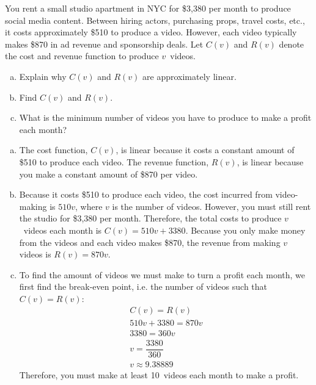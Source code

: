 \documentclass[11pt,letterpaper]{article}
\begin{document}
\newpage




 You rent a small studio apartment in NYC for \$3,380 per month to produce social media content. Between hiring actors, purchasing props, travel costs, etc., it costs approximately \$510 to produce a video. However, each video typically makes \$870 in ad revenue and sponsorship deals. Let $C(v)$ and $R(v)$ denote the cost and revenue function to produce $v$~videos. 
	\begin{enumerate}[(a)]
	\item Explain why $C(v)$ and $R(v)$ are approximately linear. 
	\item Find $C(v)$ and $R(v)$. 
	\item What is the minimum number of videos you have to produce to make a profit each month? 
	\end{enumerate} \pspace

\sol 
\begin{enumerate}[(a)]
\item The cost function, $C(v)$, is linear because it costs a constant amount of \$510 to produce each video. The revenue function, $R(v)$, is linear because you make a constant amount of \$870 per video. \pspace

\item Because it costs \$510 to produce each video, the cost incurred from video-making is $510v$, where $v$ is the number of videos. However, you must still rent the studio for \$3,380 per month. Therefore, the total costs to produce $v$~videos each month is $C(v)= 510v + 3380$. Because you only make money from the videos and each video makes \$870, the revenue from making $v$ videos is $R(v)= 870v$. \pspace

\item To find the amount of videos we must make to turn a profit each month, we first find the break-even point, i.e. the number of videos such that $C(v)= R(v)$:
	\[
	\begin{gathered}
	C(v)= R(v) \\
	510v + 3380= 870v \\
	3380= 360v \\
	v= \dfrac{3380}{360} \\
	v \approx 9.38889
	\end{gathered}
	\]
Therefore, you must make at least 10~videos each month to make a profit. 
\end{enumerate}
\end{document}
